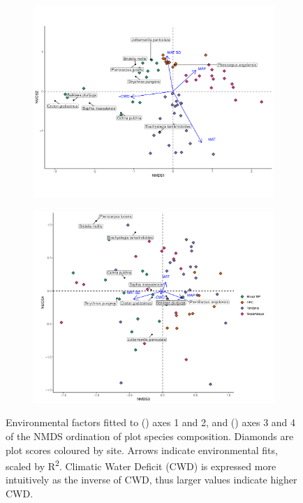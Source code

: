 \begin{refsection}
\begin{figure}
	\begin{subfigure}{0.75\linewidth}
		\includegraphics[width=\linewidth]{img/all_nmds_envfit}
		\caption{}
		\label{bicuar:nmds_envfit_12}
	\end{subfigure}
	\hfill
	\begin{subfigure}{0.75\linewidth}
		\includegraphics[width=\linewidth]{img/all_nmds_envfit_low}
		\caption{}
		\label{bicuar:nmds_envfit_34}
	\end{subfigure}
	\caption[NMDS ordination of species composition]{Environmental factors fitted to () axes 1 and 2, and () axes 3 and 4 of the NMDS ordination of plot species composition. Diamonds are plot scores coloured by site. Arrows indicate environmental fits, scaled by R\textsuperscript{2}. Climatic Water Deficit (CWD) is expressed more intuitively as the inverse of CWD, thus larger values indicate higher CWD.}
	\label{bicuar:nmds_envfit}
\end{figure}


\end{refsection}
